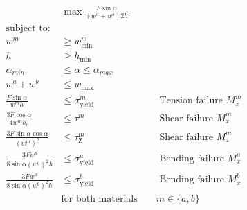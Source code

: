 \begin{align}
	& \max \frac{F \sin \alpha}{\left( w^a + w^b \right) 2h } \\
	\text{subject to:} & \nonumber \\
	w^m &\ge w_\text{min}^m \\
	h &\ge h_\text{min} \\
	\alpha_{min} &\le \alpha \le \alpha_{max}\\
	w^a + w^b &\le w_\text{max} \\
	\frac{ F \sin \alpha}{ w^m h } &\le \sigma^m_\text{yield} &&\text{ Tension failure } M_x^m \\
	\frac{ 3 F \cos \alpha }{ 4 w^m h_\text{c}} &\le \tau^m 			&&\text{ Shear failure } M_x^m \\
	\frac{ 3 F \sin \alpha \cos \alpha }{ \left(w^m \right)^2 } &\le \tau^m_\text{Z} 			&&\text{ Shear failure } M_z^m \\
	\frac{ 3 F w^b }{ 8 \sin \alpha \left(w^a \right)^2 h} & \le \sigma^a_\text{yield}			&&\text{ Bending failure } M_x^a \\
	\frac{ 3 F w^a }{ 8 \sin \alpha \left(w^b \right)^2 h} & \le \sigma^b_\text{yield}			&&\text{ Bending failure } M_x^b \\
	& \text{for both materials } && m \in \{a, b\} \nonumber
\end{align}

